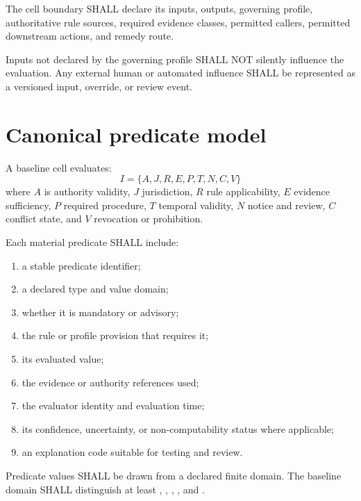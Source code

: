 \begin{requirement}[ACA-120-003]
The cell boundary SHALL declare its inputs, outputs, governing profile,
authoritative rule sources, required evidence classes, permitted callers,
permitted downstream actions, and remedy route.
\end{requirement}

\begin{requirement}[ACA-120-004]
Inputs not declared by the governing profile SHALL NOT silently influence the
evaluation. Any external human or automated influence SHALL be represented as a
versioned input, override, or review event.
\end{requirement}

\section{Canonical predicate model}
A baseline cell evaluates:
\[
I=\{A,J,R,E,P,T,N,C,V\}
\]
where $A$ is authority validity, $J$ jurisdiction, $R$ rule applicability, $E$
evidence sufficiency, $P$ required procedure, $T$ temporal validity, $N$ notice
and review, $C$ conflict state, and $V$ revocation or prohibition.

Each material predicate SHALL include:
\begin{enumerate}
\item a stable predicate identifier;
\item a declared type and value domain;
\item whether it is mandatory or advisory;
\item the rule or profile provision that requires it;
\item its evaluated value;
\item the evidence or authority references used;
\item the evaluator identity and evaluation time;
\item its confidence, uncertainty, or non-computability status where applicable;
\item an explanation code suitable for testing and review.
\end{enumerate}

\begin{requirement}[ACA-120-005]
Predicate values SHALL be drawn from a declared finite domain. The baseline
domain SHALL distinguish at least , ,
, , and .
\end{requirement}

